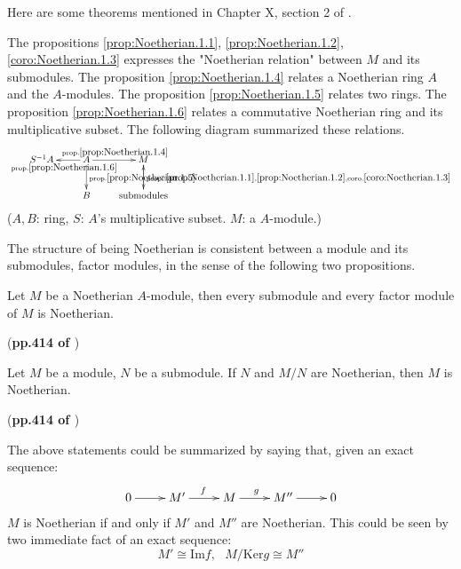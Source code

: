 \documentclass{article}
\begin{document}
Here are some theorems mentioned in Chapter X,
section 2 of \cite{lang}.

The propositions \ref{prop:Noetherian.1.1},
\ref{prop:Noetherian.1.2}, \ref{coro:Noetherian.1.3} expresses the
"Noetherian relation" between $M$ and its submodules. The proposition
\ref{prop:Noetherian.1.4} relates a Noetherian ring $A$ and the
$A$-modules. The proposition \ref{prop:Noetherian.1.5} relates two
rings. The proposition \ref{prop:Noetherian.1.6} relates a commutative
Noetherian ring and its multiplicative subset. The following diagram
summarized these relations.
$$ \xymatrix{
S^{-1}A & A
            \ar[d]^{\text{prop.} \ref{prop:Noetherian.1.5}}
            \ar[l]^{\text{prop.} \ref{prop:Noetherian.1.6}}
            \ar[r]^{\text{prop.} \ref{prop:Noetherian.1.4}}
        & M\ar[d]^{\text{prop.}:
            \ref{prop:Noetherian.1.1},
            \ref{prop:Noetherian.1.2},
            \text{coro.} \ref{coro:Noetherian.1.3}} \\
            & B       & \text{submodules}\ar[u]
} $$
($A,B$: ring, $S$: $A$'s multiplicative subset. $M$: a $A$-module.)


The structure of being Noetherian is consistent between a module
and its submodules, factor modules, in the sense of the 
following two propositions.

\begin{prop}
    \label{prop:Noetherian.1.1}
    Let $M$ be a Noetherian $A$-module, then every submodule and
    every factor module of $M$ is Noetherian.
\end{prop}
(\textbf{pp.414 of \cite{lang}})

\begin{prop}
    \label{prop:Noetherian.1.2}
    Let $M$ be a module, $N$ be a submodule. If $N$ and $M/N$ are
    Noetherian, then $M$ is Noetherian.
\end{prop}
(\textbf{pp.414 of \cite{lang}})

The above statements could be summarized by saying that, given an
exact sequence:
\begin{align*}
    \xymatrix{
    0\ar[r] & M'\ar[r]^f & M\ar[r]^g & M''\ar[r] & 0
    }
\end{align*}
$M$ is Noetherian if and only if $M'$ and $M''$ are Noetherian.
This could be seen by two immediate fact of an exact sequence:
\[
    M'\cong \text{Im}f, \text{ } M/\text{Ker}g \cong M''
\]
\end{document}
